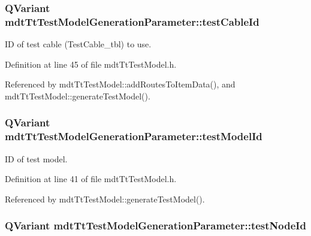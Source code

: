 \hypertarget{structmdt_tt_test_model_generation_parameter_a8afb7c2e6d598b72c8af8e0dfc4a107a}{
\subsubsection[{test\-Cable\-Id}]{\setlength{\rightskip}{0pt plus 5cm}Q\-Variant mdt\-Tt\-Test\-Model\-Generation\-Parameter\-::test\-Cable\-Id}}\label{structmdt_tt_test_model_generation_parameter_a8afb7c2e6d598b72c8af8e0dfc4a107a}


I\-D of test cable (Test\-Cable\-\_\-tbl) to use. 



Definition at line 45 of file mdt\-Tt\-Test\-Model.\-h.



Referenced by mdt\-Tt\-Test\-Model\-::add\-Routes\-To\-Item\-Data(), and mdt\-Tt\-Test\-Model\-::generate\-Test\-Model().

\hypertarget{structmdt_tt_test_model_generation_parameter_ab79f1c298f0178458237091396789f15}{
\subsubsection[{test\-Model\-Id}]{\setlength{\rightskip}{0pt plus 5cm}Q\-Variant mdt\-Tt\-Test\-Model\-Generation\-Parameter\-::test\-Model\-Id}}\label{structmdt_tt_test_model_generation_parameter_ab79f1c298f0178458237091396789f15}


I\-D of test model. 



Definition at line 41 of file mdt\-Tt\-Test\-Model.\-h.



Referenced by mdt\-Tt\-Test\-Model\-::generate\-Test\-Model().

\hypertarget{structmdt_tt_test_model_generation_parameter_a8423cfc73db0e57db394d7ce457c8c8d}{
\subsubsection[{test\-Node\-Id}]{\setlength{\rightskip}{0pt plus 5cm}Q\-Variant mdt\-Tt\-Test\-Model\-Generation\-Parameter\-::test\-Node\-Id}}\label{structmdt_tt_test_model_generation_parameter_a8423cfc73db0e57db394d7ce457c8c8d}


